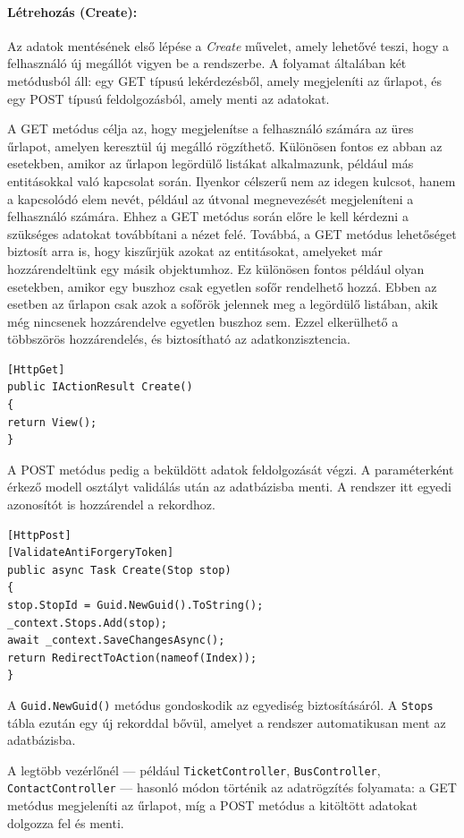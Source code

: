 \paragraph{Létrehozás (Create):}
Az adatok mentésének első lépése a \textit{Create} művelet, amely lehetővé teszi, hogy a felhasználó új megállót vigyen be a rendszerbe. A folyamat általában két metódusból áll: egy GET típusú lekérdezésből, amely megjeleníti az űrlapot, és egy POST típusú feldolgozásból, amely menti az adatokat.

A GET metódus célja az, hogy megjelenítse a felhasználó számára az üres űrlapot, amelyen keresztül új megálló rögzíthető. Különösen fontos ez abban az esetekben, amikor az űrlapon legördülő listákat alkalmazunk, például más entitásokkal való kapcsolat során. Ilyenkor célszerű nem az idegen kulcsot, hanem a kapcsolódó elem nevét, például az útvonal megnevezését megjeleníteni a felhasználó számára. Ehhez a GET metódus során előre le kell kérdezni a szükséges adatokat továbbítani a nézet felé. Továbbá, a GET metódus lehetőséget biztosít arra is, hogy kiszűrjük azokat az entitásokat, amelyeket már hozzárendeltünk egy másik objektumhoz. Ez különösen fontos például olyan esetekben, amikor egy buszhoz csak egyetlen sofőr rendelhető hozzá. Ebben az esetben az űrlapon csak azok a sofőrök jelennek meg a legördülő listában, akik még nincsenek hozzárendelve egyetlen buszhoz sem. Ezzel elkerülhető a többszörös hozzárendelés, és biztosítható az adatkonzisztencia.

\begin{lstlisting}
[HttpGet]
public IActionResult Create()
{
return View();
}
\end{lstlisting}

A POST metódus pedig a beküldött adatok feldolgozását végzi. A paraméterként érkező modell osztályt validálás után az adatbázisba menti. A rendszer itt egyedi azonosítót is hozzárendel a rekordhoz.

\begin{lstlisting}
[HttpPost]
[ValidateAntiForgeryToken]
public async Task Create(Stop stop)
{
stop.StopId = Guid.NewGuid().ToString();
_context.Stops.Add(stop);
await _context.SaveChangesAsync();
return RedirectToAction(nameof(Index));
}
\end{lstlisting}

A \texttt{Guid.NewGuid()} metódus gondoskodik az egyediség biztosításáról. A \texttt{Stops} tábla ezután egy új rekorddal bővül, amelyet a rendszer automatikusan ment az adatbázisba.

A legtöbb vezérlőnél — például \texttt{TicketController}, \texttt{BusController}, \texttt{ContactController} — hasonló módon történik az adatrögzítés folyamata: a GET metódus megjeleníti az űrlapot, míg a POST metódus a kitöltött adatokat dolgozza fel és menti.


